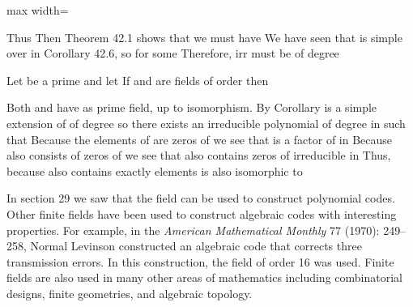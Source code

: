 \documentclass[11pt,oneside]{article}
\begin{document}
\begin{BookBody}
\begin{center}\begin{adjustbox}{max width=\linewidth}\end{adjustbox}\end{center}

\noindent Thus  Then Theorem 42.1 shows that we must have  We have seen that  is simple over  in Corollary 42.6, so  for some  Therefore, irr must be of degree \BookEnd{\blacklozenge}

 Let  be a prime and let  If  and  are fields of order  then 

 Both  and  have  as prime field, up to isomorphism. By Corollary  is a simple extension of  of degree  so there exists an irreducible polynomial  of degree  in  such that  Because the elements of  are zeros of  we see that  is a factor of  in  Because  also consists of 
zeros of  we see that  also contains zeros of irreducible  in  Thus, because  also contains exactly  elements is also isomorphic to \BookEnd{\blacklozenge}

\end{BookBody}

\BookNarrativetrue

\begin{BookBody}

In section 29 we saw that the field  can be used to construct polynomial codes. Other finite fields have been used to construct algebraic codes with interesting properties. For example, in the\textit{ American Mathematical Monthly} 77 (1970): 249–258, Normal Levinson constructed an algebraic code that corrects three transmission errors. In this construction, the field of order 16 was used. Finite fields are also used in many other areas of mathematics including combinatorial designs, finite geometries, and algebraic topology.

\end{BookBody}
\end{document}
